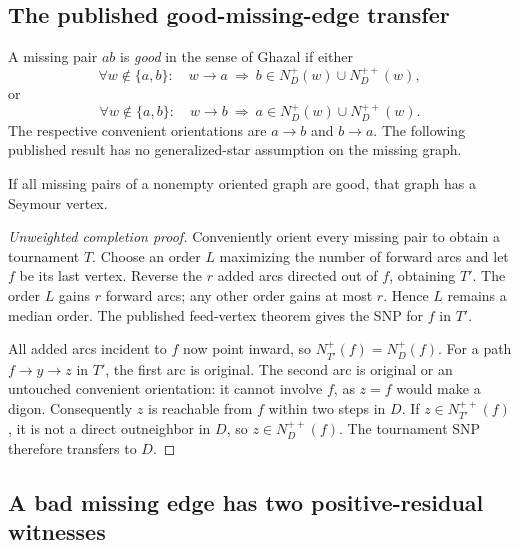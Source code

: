 \subsection{The published good-missing-edge transfer}

A missing pair $ab$ is \emph{good} in the sense of Ghazal if either
\[
 \forall w\notin\{a,b\}:\quad
 w\to a\ \Longrightarrow\ b\in N_D^+(w)\cup N_D^{++}(w),
\]
or
\[
 \forall w\notin\{a,b\}:\quad
 w\to b\ \Longrightarrow\ a\in N_D^+(w)\cup N_D^{++}(w).
\]
The respective convenient orientations are $a\to b$ and $b\to a$.
The following published result has no generalized-star assumption
on the missing graph.

\begin{theorem}
\label{thm:all-missing-good}
If all missing pairs of a nonempty oriented graph are good, that graph
has a Seymour vertex.
\end{theorem}
\begin{proof}[Unweighted completion proof]
Conveniently orient every missing pair to obtain a tournament $T$.
Choose an order $L$ maximizing the number of forward arcs and let
$f$ be its last vertex.
Reverse the $r$ added arcs directed out of $f$, obtaining $T'$.
The order $L$ gains $r$ forward arcs; any other order gains at most
$r$.  Hence $L$ remains a median order.
The published feed-vertex theorem
\cite{HavetThomasse2000} gives the SNP for $f$ in $T'$.

All added arcs incident to $f$ now point inward, so
$N_{T'}^+(f)=N_D^+(f)$.
For a path $f\to y\to z$ in $T'$, the first arc is original.
The second arc is original or an untouched convenient orientation:
it cannot involve $f$, as $z=f$ would make a digon.
Consequently $z$ is reachable from $f$ within two steps in $D$.
If $z\in N_{T'}^{++}(f)$, it is not a direct outneighbor in $D$,
so $z\in N_D^{++}(f)$.
The tournament SNP therefore transfers to $D$.
\end{proof}

\subsection{A bad missing edge has two positive-residual witnesses}

